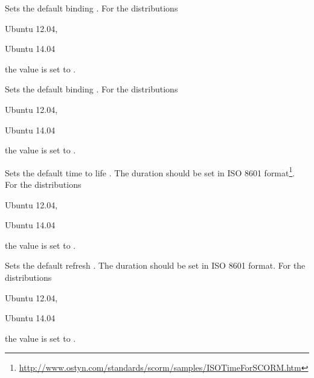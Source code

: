 Sets the default binding . For the distributions
\begin{inparaitem}
\item[\TheDistribution{ubuntu}] Ubuntu 12.04,
\item[\TheDistribution{ubuntu}] Ubuntu 14.04
\end{inparaitem}
the value is set to .


Sets the default binding . For the distributions
\begin{inparaitem}
\item[\TheDistribution{ubuntu}] Ubuntu 12.04,
\item[\TheDistribution{ubuntu}] Ubuntu 14.04
\end{inparaitem}
the value is set to .


Sets the default time to life . The duration should be set in 
ISO 8601 format\footnote{\url{http://www.ostyn.com/standards/scorm/samples/ISOTimeForSCORM.htm}}.
For the distributions
\begin{inparaitem}
\item[\TheDistribution{ubuntu}] Ubuntu 12.04,
\item[\TheDistribution{ubuntu}] Ubuntu 14.04
\end{inparaitem}
the value is set to .


Sets the default refresh . The duration should be set in 
ISO 8601 format.
For the distributions
\begin{inparaitem}
\item[\TheDistribution{ubuntu}] Ubuntu 12.04,
\item[\TheDistribution{ubuntu}] Ubuntu 14.04
\end{inparaitem}
the value is set to .

